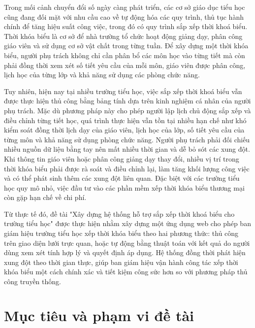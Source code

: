 \documentclass[../DoAn.tex]{subfiles}
\begin{document}
Trong mối cảnh chuyển đổi số ngày càng phát triển, các cơ sở giáo dục tiểu học cũng đang đối mặt với nhu cầu cao về tự động hóa các quy trình, thủ tục hành chính để tăng hiệu suất công việc, trong đó có quy trình sắp xếp thời khoá biểu. Thời khóa biểu là cơ sở để nhà trường tổ chức hoạt động giảng dạy, phân công giáo viên và sử dụng cơ sở vật chất trong từng tuần. Để xây dựng một thời khóa biểu, người phụ trách không chỉ cần phân bổ các môn học vào từng tiết mà còn phải đồng thời xem xét số tiết yêu cầu của mỗi môn, giáo viên được phân công, lịch học của từng lớp và khả năng sử dụng các phòng chức năng.

Tuy nhiên, hiện nay tại nhiều trường tiểu học, việc sắp xếp thời khoá biểu vẫn được thực hiện thủ công bằng bảng tính dựa trên kinh nghiệm cá nhân của người phụ trách. Mặc dù phương pháp này cho phép người lập lịch chủ động sắp xếp và điều chỉnh từng tiết học, quá trình thực hiện vẫn tồn tại nhiều hạn chế như khó kiểm soát đồng thời lịch dạy của giáo viên, lịch học của lớp, số tiết yêu cầu của từng môn và khả năng sử dụng phòng chức năng. Người phụ trách phải đối chiếu nhiều nguồn dữ liệu bằng tay nên mất nhiều thời gian và dễ bỏ sót các xung đột. Khi thông tin giáo viên hoặc phân công giảng dạy thay đổi, nhiều vị trí trong thời khóa biểu phải được rà soát và điều chỉnh lại, làm tăng khối lượng công việc và có thể phát sinh thêm các xung đột liên quan. Đặc biệt với các trường tiểu học quy mô nhỏ, việc đầu tư vào các phần mềm xếp thời khóa biểu thương mại còn gặp hạn chế về chi phí.

Từ thực tế đó, đề tài "Xây dựng hệ thống hỗ trợ sắp xếp thời khoá biểu cho trường tiểu học" được thực hiện nhằm xây dựng một ứng dụng web cho phép ban giám hiệu trường tiểu học xếp thời khóa biểu theo hai phương thức: thủ công trên giao diện lưới trực quan, hoặc tự động bằng thuật toán với kết quả do người dùng xem xét tính hợp lý và quyết định áp dụng. Hệ thống đồng thời phát hiện xung đột theo thời gian thực, giúp ban giám hiệu vận hành công tác xếp thời khóa biểu một cách chính xác và tiết kiệm công sức hơn so với phương pháp thủ công truyền thống.

\section{Mục tiêu và phạm vi đề tài}
\label{section:1.2}
\end{document}
